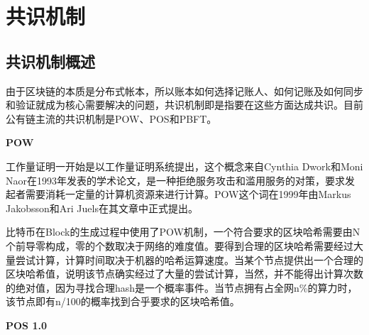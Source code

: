 \documentclass[a4paper,12pt]{article}
\begin{document}
\section{共识机制}
\subsection{共识机制概述}

由于区块链的本质是分布式帐本，所以账本如何选择记账人、如何记账及如何同步和验证就成为核心需要解决的问题，共识机制即是指要在这些方面达成共识。目前公有链主流的共识机制是POW、POS和PBFT。

\textbf{POW}

工作量证明一开始是以工作量证明系统提出，这个概念来自Cynthia Dwork和Moni Naor在1993年发表的学术论文，是一种拒绝服务攻击和滥用服务的对策，要求发起者需要消耗一定量的计算机资源来进行计算。POW这个词在1999年由Markus Jakobsson和Ari Juels在其文章中正式提出。

比特币在Block的生成过程中使用了POW机制，一个符合要求的区块哈希需要由N个前导零构成，零的个数取决于网络的难度值。要得到合理的区块哈希需要经过大量尝试计算，计算时间取决于机器的哈希运算速度。当某个节点提供出一个合理的区块哈希值，说明该节点确实经过了大量的尝试计算，当然，并不能得出计算次数的绝对值，因为寻找合理hash是一个概率事件。当节点拥有占全网n\%的算力时，该节点即有n/100的概率找到合乎要求的区块哈希值。


\textbf{POS 1.0}
\end{document}
